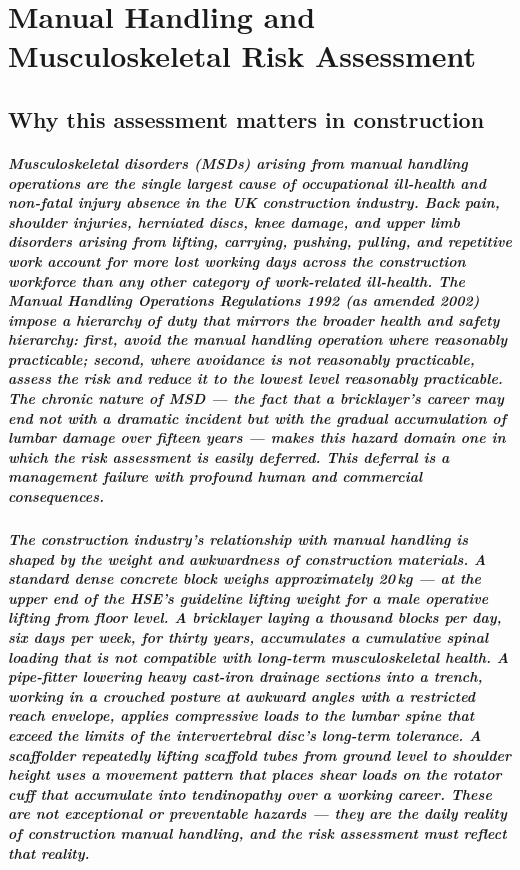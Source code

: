 \chapter{Manual Handling and Musculoskeletal Risk Assessment}
\label{chap:Manual Handling and Musculoskeletal Risk Assessment}

\section{Why this assessment matters in construction}

\paragraph{Musculoskeletal disorders (MSDs) arising from manual handling operations are the single largest cause of occupational ill-health and non-fatal injury absence in the UK construction industry. Back pain, shoulder injuries, herniated discs, knee damage, and upper limb disorders arising from lifting, carrying, pushing, pulling, and repetitive work account for more lost working days across the construction workforce than any other category of work-related ill-health. The Manual Handling Operations Regulations 1992 (as amended 2002) impose a hierarchy of duty that mirrors the broader health and safety hierarchy: first, avoid the manual handling operation where reasonably practicable; second, where avoidance is not reasonably practicable, assess the risk and reduce it to the lowest level reasonably practicable. The chronic nature of MSD --- the fact that a bricklayer's career may end not with a dramatic incident but with the gradual accumulation of lumbar damage over fifteen years --- makes this hazard domain one in which the risk assessment is easily deferred. This deferral is a management failure with profound human and commercial consequences.}

\paragraph{The construction industry's relationship with manual handling is shaped by the weight and awkwardness of construction materials. A standard dense concrete block weighs approximately 20\,kg --- at the upper end of the HSE's guideline lifting weight for a male operative lifting from floor level. A bricklayer laying a thousand blocks per day, six days per week, for thirty years, accumulates a cumulative spinal loading that is not compatible with long-term musculoskeletal health. A pipe-fitter lowering heavy cast-iron drainage sections into a trench, working in a crouched posture at awkward angles with a restricted reach envelope, applies compressive loads to the lumbar spine that exceed the limits of the intervertebral disc's long-term tolerance. A scaffolder repeatedly lifting scaffold tubes from ground level to shoulder height uses a movement pattern that places shear loads on the rotator cuff that accumulate into tendinopathy over a working career. These are not exceptional or preventable hazards --- they are the daily reality of construction manual handling, and the risk assessment must reflect that reality.}

